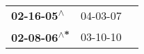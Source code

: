 \begin{supertabular}{lll}
  \textbf{02-16-05\textsuperscript{$\wedge$}} &  04-03-07\textsuperscript{} \\
 \textbf{02-08-06\textsuperscript{$\wedge$*}} &  03-10-10\textsuperscript{} \\
\end{supertabular}
